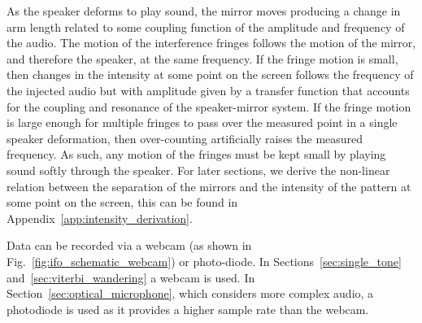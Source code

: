 \documentclass[paper-main.tex]{subfiles}
\begin{document}
As the speaker deforms to play sound, the mirror moves producing a change in arm length related to some coupling function of the amplitude and frequency of the audio. 
The motion of the interference fringes follows the motion of the mirror, and therefore the speaker, at the same frequency. 
If the fringe motion is small, then changes in the intensity at some point on the screen follows the frequency of the injected audio but with amplitude given by a transfer function that accounts for the coupling and resonance of the speaker-mirror system.
If the fringe motion is large enough for multiple fringes to pass over the measured point in a single speaker deformation, then over-counting artificially raises the measured frequency. As such, any motion of the fringes must be kept small by playing sound softly through the speaker.
For later sections, we derive the non-linear relation between the separation of the mirrors and the intensity of the pattern at some point on the screen, this can be found in Appendix~\ref{app:intensity_derivation}. %



Data can be recorded via a webcam (as shown in Fig.~\ref{fig:ifo_schematic_webcam}) or photo-diode. 
In Sections~\ref{sec:single_tone} and~\ref{sec:viterbi_wandering} a webcam is used. 
In Section~\ref{sec:optical_microphone}, which considers more complex audio, a photodiode is used as it provides a higher sample rate than the webcam. 



\end{document}
